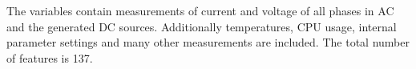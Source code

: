 The variables contain measurements of current and voltage of all phases in AC and the generated DC sources. Additionally temperatures, CPU usage, internal parameter settings and many other measurements are included. The total number of features is 137.
